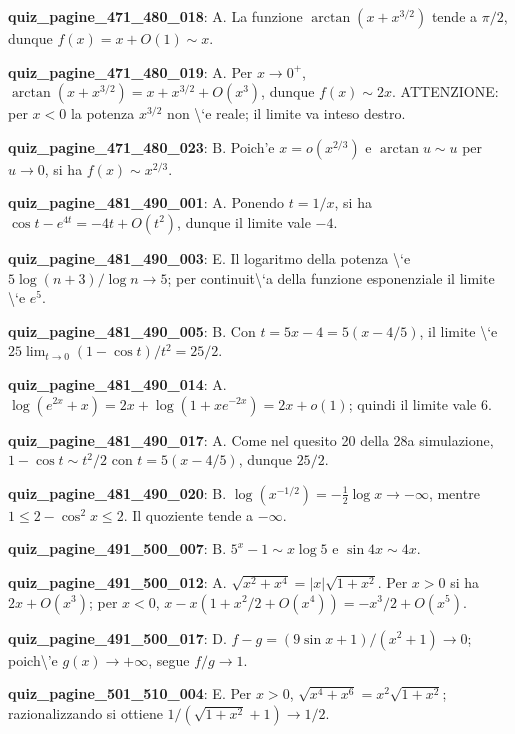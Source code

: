 \documentclass[11pt,a4paper]{article}
\newcounter{quiz}
\begin{document}
\noindent\textbf{quiz\_pagine\_471\_480\_018}: A. La funzione $\arctan(x+x^{3/2})$ tende a $\pi/2$, dunque $f(x)=x+O(1)\sim x$.\par\medskip
\noindent\textbf{quiz\_pagine\_471\_480\_019}: A. Per $x\to0^+$, $\arctan(x+x^{3/2})=x+x^{3/2}+O(x^3)$, dunque $f(x)\sim2x$. ATTENZIONE: per $x<0$ la potenza $x^{3/2}$ non \textbackslash{}`e reale; il limite va inteso destro.\par\medskip
\noindent\textbf{quiz\_pagine\_471\_480\_023}: B. Poich'e $x=o(x^{2/3})$ e $\arctan u\sim u$ per $u\to0$, si ha $f(x)\sim x^{2/3}$.\par\medskip
\noindent\textbf{quiz\_pagine\_481\_490\_001}: A. Ponendo $t=1/x$, si ha $\cos t-e^{4t}=-4t+O(t^2)$, dunque il limite vale $-4$.\par\medskip
\noindent\textbf{quiz\_pagine\_481\_490\_003}: E. Il logaritmo della potenza \textbackslash{}`e $5\log(n+3)/\log n\to5$; per continuit\textbackslash{}`a della funzione esponenziale il limite \textbackslash{}`e $e^5$.\par\medskip
\noindent\textbf{quiz\_pagine\_481\_490\_005}: B. Con $t=5x-4=5(x-4/5)$, il limite \textbackslash{}`e $25\lim_{t\to0}(1-\cos t)/t^2=25/2$.\par\medskip
\noindent\textbf{quiz\_pagine\_481\_490\_014}: A. $\log(e^{2x}+x)=2x+\log(1+xe^{-2x})=2x+o(1)$; quindi il limite vale $6$.\par\medskip
\noindent\textbf{quiz\_pagine\_481\_490\_017}: A. Come nel quesito 20 della 28a simulazione, $1-\cos t\sim t^2/2$ con $t=5(x-4/5)$, dunque $25/2$.\par\medskip
\noindent\textbf{quiz\_pagine\_481\_490\_020}: B. $\log(x^{-1/2})=-\frac12\log x\to-\infty$, mentre $1\le2-\cos^2x\le2$. Il quoziente tende a $-\infty$.\par\medskip
\noindent\textbf{quiz\_pagine\_491\_500\_007}: B. $5^x-1\sim x\log5$ e $\sin4x\sim4x$.\par\medskip
\noindent\textbf{quiz\_pagine\_491\_500\_012}: A. $\sqrt{x^2+x^4}=|x|\sqrt{1+x^2}$. Per $x>0$ si ha $2x+O(x^3)$; per $x<0$, $x-x(1+x^2/2+O(x^4))=-x^3/2+O(x^5)$.\par\medskip
\noindent\textbf{quiz\_pagine\_491\_500\_017}: D. $f-g=(9\sin x+1)/(x^2+1)\to0$; poich\textbackslash{}'e $g(x)\to+\infty$, segue $f/g\to1$.\par\medskip
\noindent\textbf{quiz\_pagine\_501\_510\_004}: E. Per $x>0$, $\sqrt{x^4+x^6}=x^2\sqrt{1+x^2}$; razionalizzando si ottiene $1/(\sqrt{1+x^2}+1)\to1/2$.\par\medskip
\end{document}
